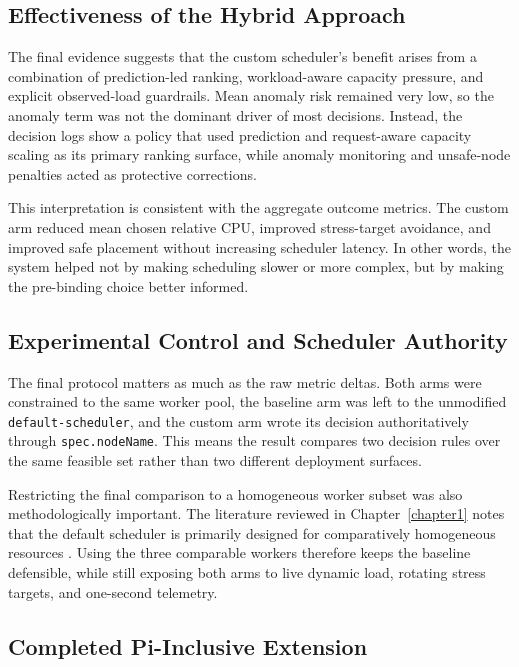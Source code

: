 \subsection{Effectiveness of the Hybrid Approach}

The final evidence suggests that the custom scheduler's benefit arises from a combination of prediction-led ranking, workload-aware capacity pressure, and explicit observed-load guardrails. Mean anomaly risk remained very low, so the anomaly term was not the dominant driver of most decisions. Instead, the decision logs show a policy that used prediction and request-aware capacity scaling as its primary ranking surface, while anomaly monitoring and unsafe-node penalties acted as protective corrections.

This interpretation is consistent with the aggregate outcome metrics. The custom arm reduced mean chosen relative CPU, improved stress-target avoidance, and improved safe placement without increasing scheduler latency. In other words, the system helped not by making scheduling slower or more complex, but by making the pre-binding choice better informed.


\subsection{Experimental Control and Scheduler Authority}

The final protocol matters as much as the raw metric deltas. Both arms were constrained to the same worker pool, the baseline arm was left to the unmodified \texttt{default-scheduler}, and the custom arm wrote its decision authoritatively through \texttt{spec.nodeName}. This means the result compares two decision rules over the same feasible set rather than two different deployment surfaces.

Restricting the final comparison to a homogeneous worker subset was also methodologically important. The literature reviewed in Chapter~\ref{chapter1} notes that the default scheduler is primarily designed for comparatively homogeneous resources \cite{liu2024dynamic}. Using the three comparable workers therefore keeps the baseline defensible, while still exposing both arms to live dynamic load, rotating stress targets, and one-second telemetry.


\subsection{Completed Pi-Inclusive Extension}

